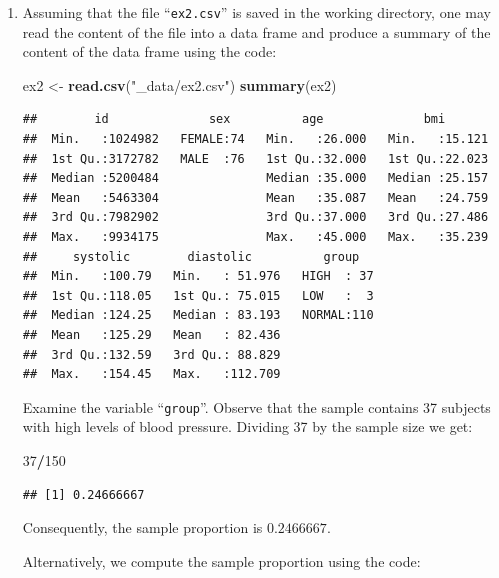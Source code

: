 \documentclass[]{krantz}
\makeatletter
\newenvironment{Shaded}{\begin{snugshade}}{\end{snugshade}}
\newcommand{\KeywordTok}[1]{\textcolor[rgb]{0.13,0.29,0.53}{\textbf{#1}}}
\newcommand{\DecValTok}[1]{\textcolor[rgb]{0.00,0.00,0.81}{#1}}
\newcommand{\StringTok}[1]{\textcolor[rgb]{0.31,0.60,0.02}{#1}}
\newcommand{\OperatorTok}[1]{\textcolor[rgb]{0.81,0.36,0.00}{\textbf{#1}}}
\newcommand{\NormalTok}[1]{#1}
\newenvironment{kframe}{%
\medskip{}
\setlength{\fboxsep}{.8em}
 \def\at@end@of@kframe{}%
 \ifinner\ifhmode%
  \def\at@end@of@kframe{\end{minipage}}%
  \begin{minipage}{\columnwidth}%
 \fi\fi%
 \def\FrameCommand##1{\hskip\@totalleftmargin \hskip-\fboxsep
 \colorbox{shadecolor}{##1}\hskip-\fboxsep
     \hskip-\linewidth \hskip-\@totalleftmargin \hskip\columnwidth}%
 \MakeFramed {\advance\hsize-\width
   \@totalleftmargin\z@ \linewidth\hsize
   \@setminipage}}%
 {\par\unskip\endMakeFramed%
 \at@end@of@kframe}
\renewenvironment{Shaded}{\begin{kframe}}{\end{kframe}}
\theoremstyle{definition}
\theoremstyle{definition}
\theoremstyle{definition}
\theoremstyle{remark}
\makeatother
\begin{document}
\begin{enumerate}
\def\labelenumi{\arabic{enumi}.}
\item
  Assuming that the file ``\texttt{ex2.csv}'' is saved in the working
  directory, one may read the content of the file into a data frame and
  produce a summary of the content of the data frame using the code:

\begin{Shaded}
\begin{Highlighting}[]
\NormalTok{ex2 <-}\StringTok{ }\KeywordTok{read.csv}\NormalTok{(}\StringTok{"_data/ex2.csv"}\NormalTok{)}
\KeywordTok{summary}\NormalTok{(ex2)}
\end{Highlighting}
\end{Shaded}

\begin{verbatim}
##        id              sex          age              bmi        
##  Min.   :1024982   FEMALE:74   Min.   :26.000   Min.   :15.121  
##  1st Qu.:3172782   MALE  :76   1st Qu.:32.000   1st Qu.:22.023  
##  Median :5200484               Median :35.000   Median :25.157  
##  Mean   :5463304               Mean   :35.087   Mean   :24.759  
##  3rd Qu.:7982902               3rd Qu.:37.000   3rd Qu.:27.486  
##  Max.   :9934175               Max.   :45.000   Max.   :35.239  
##     systolic        diastolic          group    
##  Min.   :100.79   Min.   : 51.976   HIGH  : 37  
##  1st Qu.:118.05   1st Qu.: 75.015   LOW   :  3  
##  Median :124.25   Median : 83.193   NORMAL:110  
##  Mean   :125.29   Mean   : 82.436               
##  3rd Qu.:132.59   3rd Qu.: 88.829               
##  Max.   :154.45   Max.   :112.709
\end{verbatim}

  Examine the variable ``\texttt{group}''. Observe that the sample
  contains 37 subjects with high levels of blood pressure. Dividing 37
  by the sample size we get:

\begin{Shaded}
\begin{Highlighting}[]
\DecValTok{37}\OperatorTok{/}\DecValTok{150}
\end{Highlighting}
\end{Shaded}

\begin{verbatim}
## [1] 0.24666667
\end{verbatim}

  Consequently, the sample proportion is \(0.2466667\).

  Alternatively, we compute the sample proportion using the code:


\end{enumerate}
\end{document}

